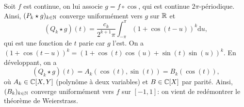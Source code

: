 \begin{remark}
    Soit 
    $f$ est continue, on lui associe $g=f\circ \cos$, qui est continue $2\pi$-périodique. Ainsi, $(P_{k}\star g)_{k\in\mathbb{N}}$ converge uniformément vers $g$ sur $\mathbb{R}$ et 
    \begin{equation}
        (Q_{k}\star g)(t)=\frac{c_{k}}{2^{k+1}\pi}\int_{-\pi}^{\pi}\left(1+\cos(t-u)\right)^{k}\mathrm{d}u,
    \end{equation}
    qui est une fonction de $t$ parie car $g$ l'est. On a $(1+\cos(t-u))^{k}=\left(1+\cos(t)\cos(u)+\sin(t)\sin(u)\right)^{k}$. En développant, on a
    \begin{equation}
        (Q_{k}\star g)(t)=A_{k}(\cos(t),\sin(t))=B_{k}(\cos(t)),
    \end{equation}
    où $A_{k}\in\mathbb{C}[X,Y]$ (polynôme à deux variables) et $B\in\mathbb{C}[X]$ par parité. Ainsi, $(B_{k})_{k\in\mathbb{N}}$ converge uniformément vers $f$ sur $[-1,1]$: on vient de redémontrer le théorème de Weierstrass.
\end{remark}


